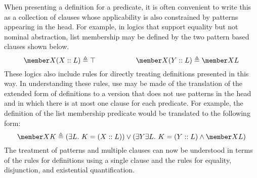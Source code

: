 When presenting a definition for a predicate, it is often convenient
to write this as a collection of clauses whose applicability is also
constrained by patterns appearing in the head. For example, in logics
that support equality but not nominal abstraction, list membership
may be defined by the two pattern based clauses shown below.
\begin{equation*}
\member X (X::L) \triangleq \top \hspace{2cm}
\member X (Y::L) \triangleq \member X L
\end{equation*}
These logics also include rules for directly treating definitions
presented in this way. In understanding these rules, use may be made
of the translation of the extended form of definitions to a version
that does not use patterns in the head and in which there is at most
one clause for each predicate. For example, the definition of the list
membership predicate would be translated to the following form:
\begin{equation*}
\member X K \triangleq (\exists L.~ K = (X :: L)) \lor
 (\exists Y \exists L.~ K = (Y :: L) \land \member X L)
\end{equation*}
The treatment of patterns and multiple clauses can now be understood
in terms of the rules for definitions using a single clause and the
rules for equality, disjunction, and existential quantification.

